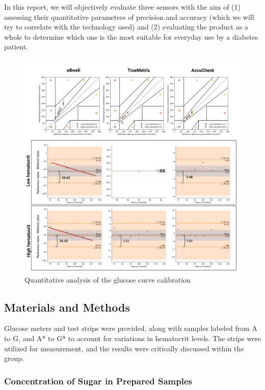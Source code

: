 \documentclass[conference]{IEEEtran}
\begin{document}
In this report, we will objectively evaluate three sensors with the aim of (1) assessing their quantitative parameters of precision and accuracy 
(which we will try to correlate with the technology used) and (2) evaluating the product as a whole to determine which one is the most suitable 
for everyday use by a diabetes patient.

\begin{figure}[!th]
   \afterpage{\clearpage}
   \centering
   \includegraphics[width=\textwidth]{images/Quantitative results.png}
   \caption{Quantitative analysis of the glucose curve calibration}
   \label{fig:quantitative}
\end{figure}

\clearpage

\subsection{Materials and Methods}
Glucose meters and test strips were provided, along with samples labeled from A to G, and A* to G* to account for variations in hematocrit levels. 
The strips were utilized for measurement, and the results were critically discussed within the group.

\subsubsection{Concentration of Sugar in Prepared Samples}
\end{document}

